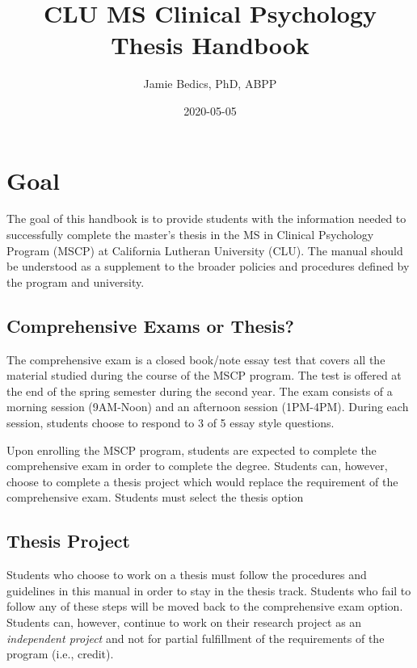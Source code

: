 \documentclass[]{book}
\title{CLU MS Clinical Psychology Thesis Handbook}
\author{Jamie Bedics, PhD, ABPP}
\date{2020-05-05}
\begin{document}
\maketitle

{
\setcounter{tocdepth}{1}
\tableofcontents
}
\hypertarget{goal}{%
\chapter{Goal}\label{goal}}

The goal of this handbook is to provide students with the information needed to successfully complete the master's thesis in the MS in Clinical Psychology Program (MSCP) at California Lutheran University (CLU). The manual should be understood as a supplement to the broader policies and procedures defined by the program and university.

\hypertarget{comprehensive-exams-or-thesis}{%
\section{Comprehensive Exams or Thesis?}\label{comprehensive-exams-or-thesis}}

The comprehensive exam is a closed book/note essay test that covers all the material studied during the course of the MSCP program. The test is offered at the end of the spring semester during the second year. The exam consists of a morning session (9AM-Noon) and an afternoon session (1PM-4PM). During each session, students choose to respond to 3 of 5 essay style questions.

Upon enrolling the MSCP program, students are expected to complete the comprehensive exam in order to complete the degree. Students can, however, choose to complete a thesis project which would replace the requirement of the comprehensive exam. Students must select the thesis option

\hypertarget{thesis-project}{%
\section{Thesis Project}\label{thesis-project}}

Students who choose to work on a thesis must follow the procedures and guidelines in this manual in order to stay in the thesis track. Students who fail to follow any of these steps will be moved back to the comprehensive exam option. Students can, however, continue to work on their research project as an \emph{independent project} and not for partial fulfillment of the requirements of the program (i.e., credit).
\end{document}
